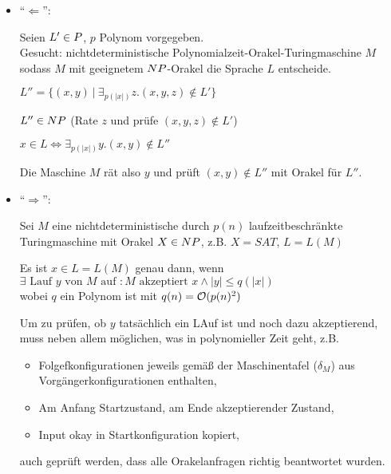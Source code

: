 \begin{beweis}
    
    \begin{itemize}

        \item ``$\Leftarrow$'':

            Seien $L' \in P$, $p$ Polynom vorgegeben.\\

            Gesucht: nichtdeterministische Polynomialzeit-Orakel-Turingmaschine $M$ sodass $M$ mit geeignetem $NP$-Orakel die Sprache $L$ entscheide.

            $L'' = \{ (x,y) \ |\  \exists_{p(|x|)} z . (x,y,z) \notin L' \} $

            $L'' \in NP$ (Rate $z$ und prüfe $(x,y,z) \notin L'$)

            $x \in L \Leftrightarrow \exists_{p(|x|)} y . (x,y) \notin L'' $

            Die Maschine $M$ rät also $y$ und prüft $(x,y) \notin L''$ mit Orakel für $L''$.

        \item ``$\Rightarrow$'':

            Sei $M$ eine nichtdeterministische durch $p(n)$ laufzeitbeschränkte Turingmaschine mit Orakel $X \in NP$, z.B. $X = SAT$, $L = L(M)$

            Es ist $x \in L = L(M)$ genau dann, wenn \\
            $\exists \text{ Lauf } y \text{ von } M \text{ auf }: 
            M \text{ akzeptiert } x \land |y| \leq q(|x|)$ \\
            wobei $q$ ein Polynom ist mit $q(n) = \mathcal{O}(p(n)^2)$

            Um zu prüfen, ob $y$ tatsächlich ein LAuf ist und noch dazu akzeptierend, muss neben allem möglichen, was in polynomieller Zeit geht, z.B. 
            \begin{itemize}
                \item Folgefkonfigurationen jeweils gemäß der Maschinentafel ($\delta_M$) aus Vorgängerkonfigurationen enthalten,
                \item Am Anfang Startzustand, am Ende akzeptierender Zustand,
                \item Input okay in Startkonfiguration kopiert,
            \end{itemize}
            auch geprüft werden, dass alle Orakelanfragen richtig beantwortet wurden.


\end{itemize}
\end{beweis}
